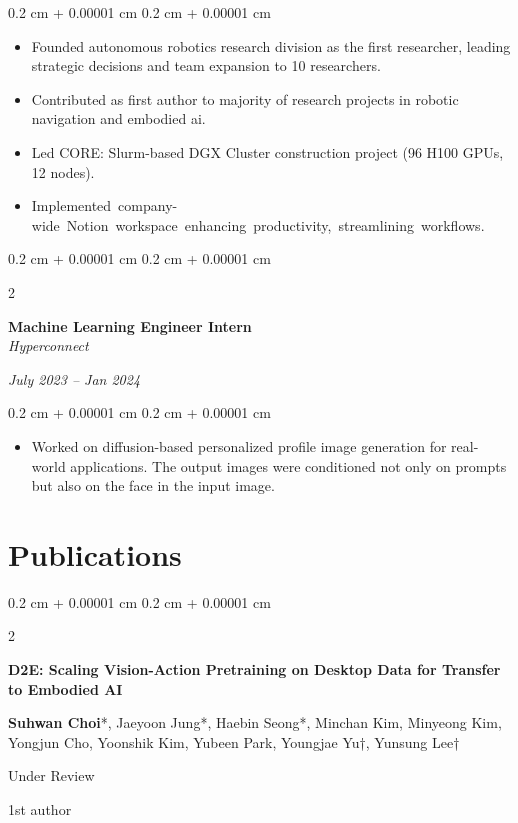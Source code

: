 \documentclass[10pt, letterpaper]{article}
\newenvironment{highlights}{
    \begin{itemize}[
        topsep=0.10 cm,
        parsep=0.10 cm,
        partopsep=0pt,
        itemsep=0pt,
        leftmargin=0.4 cm + 10pt
    ]
}{
    \end{itemize}
} %
\newenvironment{onecolentry}{
    \begin{adjustwidth}{
        0.2 cm + 0.00001 cm
    }{
        0.2 cm + 0.00001 cm
    }
}{
    \end{adjustwidth}
} %
\newenvironment{twocolentry}[2][]{
    \onecolentry
    \def\secondColumn{#2}
    \setcolumnwidth{\fill, 4.5 cm}
    \begin{paracol}{2}
}{
    \switchcolumn \raggedleft \secondColumn
    \end{paracol}
    \endonecolentry
} %
\let\hrefWithoutArrow\href
\renewcommand{\href}[2]{\hrefWithoutArrow{#1}{\ifthenelse{\equal{#2}{}}{ }{#2 }\raisebox{.15ex}{\footnotesize \faExternalLink*}}}
\begin{document}
\vspace{0.10 cm}
\begin{onecolentry}
    \begin{highlights}
        \item Founded autonomous robotics research division as the first researcher, leading strategic decisions and team expansion to 10 researchers.
        \item Contributed as first author to majority of research projects in robotic navigation and embodied ai.
        \item Led CORE: Slurm-based DGX Cluster construction project (96 H100 GPUs, 12 nodes). \href{https://worv.ghost.io/core-construction/}{[Blog]}
        \item \mbox{Implemented company-wide Notion workspace enhancing productivity, streamlining workflows.} \href{https://milkclouds.notion.site/DBs-template-1816b908318e809e9f93ecbfe7d4ca86}{[Template]}
    \end{highlights}
\end{onecolentry}

\vspace{0.2 cm}

\begin{twocolentry}{
        \textit{July 2023 – Jan 2024}
    }
    \textbf{Machine Learning Engineer Intern}
    \\
    \textit{Hyperconnect}
\end{twocolentry}

\vspace{0.10 cm}
\begin{onecolentry}
    \begin{highlights}
        \item Worked on diffusion-based personalized profile image generation for real-world applications. The output images were conditioned not only on prompts but also on the face in the input image.
    \end{highlights}
\end{onecolentry}

\section{Publications}

\begin{samepage}
    \begin{twocolentry}{
            1st author
        }
        \textbf{D2E: Scaling Vision-Action Pretraining on Desktop Data for Transfer to Embodied AI} \href{https://worv-ai.github.io/d2e/}{[Website]}

        \vspace{0.10 cm}

        \small \textbf{Suhwan Choi}*, Jaeyoon Jung*, Haebin Seong*, Minchan Kim, Minyeong Kim, Yongjun Cho, Yoonshik Kim, Yubeen Park, Youngjae Yu†, Yunsung Lee†

        \vspace{0.10 cm}

        Under Review
    \end{twocolentry}
\end{samepage}
\end{document}
